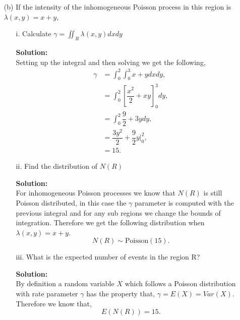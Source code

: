\documentclass[12pt]{article}
\makeatletter
\theoremstyle{homework}
\newenvironment{exercise}[1]
{\def\@currentlabel{#1}\exercisecore}
{\endexercisecore}
\newcommand{\localhead}[1]{\par\smallskip\noindent\textbf{#1}\nobreak\\}%
\newcommand\solution{\localhead{Solution:}}
\makeatother
\begin{document}
\begin{exercise}{2}
\begin{enumerate}
    \item[(b)] If the intensity of the inhomogeneous Poisson process in this region is $\lambda(x, y) = x + y$, \\
    \begin{enumerate}
      \item[i.] Calculate $\gamma = \iint_R \lambda(x, y) dx dy$\\
      \solution Setting up the integral and then solving we get the following, 
      \begin{align*}
        \gamma &= \int_0^2 \int_0^3 x + y dxdy,\\
         &= \int_0^2 [\dfrac{x^2}{2} + xy]_0^3 dy,\\
         &= \int_0^2 \dfrac{9}{2} + 3y dy,\\
         &=  \dfrac{3y^2}{2} + \dfrac{9}{2}y |_0^2,\\
         &=  15.
      \end{align*}
      \vspace{.15in}
      \item[ii.] Find the distribution of $N(R)$\\
      \solution For inhomogeneous Poisson processes we know that $N(R)$ is still Poisson distributed, in this case the $\gamma$ parameter is computed 
      with the previous integral and for any sub regions we change the bounds of integration. Therefore we get the following distribution when $\lambda(x, y) = x + y$.\\
      \begin{equation*}
        N(R) \sim \text{Poisson}(15).
      \end{equation*}
      \vspace{.15in}
     \item[iii.] What is the expected number of events in the region R?\\
     \solution By definition a random variable $X$ which follows a Poisson distribution with rate parameter $\gamma$ has the property that, $\gamma = E(X) = Var(X)$. Therefore we know that, 
     \begin{equation*}
       E(N(R)) = 15. 
     \end{equation*}
    \end{enumerate} 
  \end{enumerate}
\end{exercise}
\vspace{.5in}
\end{document}
